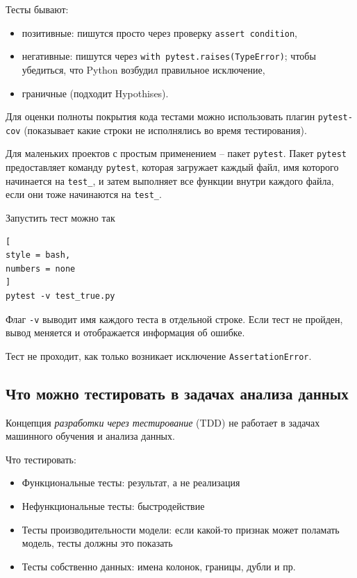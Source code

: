 \documentclass[%
	11pt,
	a4paper,
	utf8,
		]{article}
\begin{document}
Тесты бывают:
\begin{itemize}
	\item позитивные: пишутся просто через проверку \texttt{assert condition},
	
	\item негативные: пишутся через \texttt{with pytest.raises(TypeError)}; чтобы убедиться, что Python возбудил правильное исключение,
	
	\item граничные (подходит Hypothises).
\end{itemize}

Для оценки полноты покрытия кода тестами можно использовать плагин \texttt{pytest-cov} (показывает какие строки не исполнялись во время тестирования).

Для маленьких проектов с простым применением -- пакет \texttt{pytest}. Пакет \texttt{pytest} предоставляет команду \texttt{pytest}, которая загружает каждый файл, имя которого начинается на \texttt{test\_}, и затем выполняет все функции внутри каждого файла, если они тоже начинаются на \texttt{test\_}.

Запустить тест можно так
\begin{lstlisting}[
style = bash,
numbers = none	
]
pytest -v test_true.py
\end{lstlisting}

Флаг \verb|-v| выводит имя каждого теста в отдельной строке. Если тест не пройден, вывод меняется и отображается информация об ошибке.

Тест не проходит, как только возникает исключение \texttt{AssertationError}.

\subsection{Что можно тестировать в задачах анализа данных}

{\color{red} Концепция \emph{разработки через тестирование} (TDD) не работает в задачах машинного обучения и анализа данных.}

Что тестировать:
\begin{itemize}
	\item Функциональные тесты: результат, а не реализация
	
	\item Нефункциональные тесты: быстродействие
	
	\item Тесты производительности модели: если какой-то признак может поламать модель, тесты должны это показать
	
	\item Тесты собственно данных: имена колонок, границы, дубли и пр.
\end{itemize}
\end{document}
